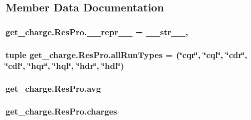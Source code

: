 \subsection{Member Data Documentation}
\hypertarget{classget__charge_1_1_res_pro_a2d6a3912943f7b858e8b5f04231c3420}{
\subsubsection[{\-\_\-\-\_\-repr\-\_\-\-\_\-}]{\setlength{\rightskip}{0pt plus 5cm}get\-\_\-charge.\-Res\-Pro.\-\_\-\-\_\-repr\-\_\-\-\_\- = {\bf \-\_\-\-\_\-str\-\_\-\-\_\-}\hspace{0.3cm}{\ttfamily [static]}, {\ttfamily [private]}}}\label{classget__charge_1_1_res_pro_a2d6a3912943f7b858e8b5f04231c3420}
\hypertarget{classget__charge_1_1_res_pro_a19f4f7319d0e78071cad89e477d96f9f}{
\subsubsection[{all\-Run\-Types}]{\setlength{\rightskip}{0pt plus 5cm}tuple get\-\_\-charge.\-Res\-Pro.\-all\-Run\-Types = (\char`\"{}cqr\char`\"{}, \char`\"{}cql\char`\"{}, \char`\"{}cdr\char`\"{}, \char`\"{}cdl\char`\"{}, \char`\"{}hqr\char`\"{}, \char`\"{}hql\char`\"{}, \char`\"{}hdr\char`\"{}, \char`\"{}hdl\char`\"{})\hspace{0.3cm}{\ttfamily [static]}}}\label{classget__charge_1_1_res_pro_a19f4f7319d0e78071cad89e477d96f9f}
\hypertarget{classget__charge_1_1_res_pro_a19649fb10b2d365eddf247107e39b0d0}{
\subsubsection[{avg}]{\setlength{\rightskip}{0pt plus 5cm}get\-\_\-charge.\-Res\-Pro.\-avg}}\label{classget__charge_1_1_res_pro_a19649fb10b2d365eddf247107e39b0d0}
\hypertarget{classget__charge_1_1_res_pro_aaa9de483c5f88fe49fd682dd1b8a62e7}{
\subsubsection[{charges}]{\setlength{\rightskip}{0pt plus 5cm}get\-\_\-charge.\-Res\-Pro.\-charges}}\label{classget__charge_1_1_res_pro_aaa9de483c5f88fe49fd682dd1b8a62e7}
